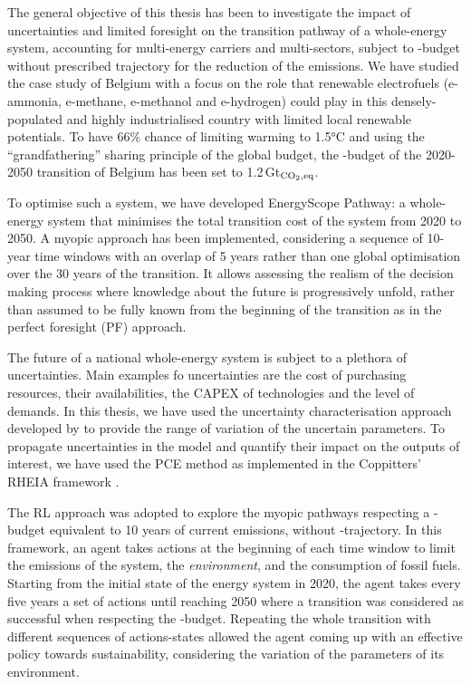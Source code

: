 

The general objective of this thesis has been to investigate the impact of uncertainties and limited foresight on the transition pathway of a whole-energy system, accounting for multi-energy carriers and multi-sectors, subject to -budget without prescribed trajectory for the reduction of the emissions.  We have studied the case study of Belgium with a focus on the role that renewable electrofuels (e-ammonia, e-methane, e-methanol and e-hydrogen) could play in this densely-populated and highly industrialised country with limited local renewable potentials. To have 66\% chance of limiting warming to 1.5°C and using the ``grandfathering'' sharing principle of the global budget, the -budget of the 2020-2050 transition of Belgium has been set to 1.2\,Gt$_{\ce{CO2},\text{eq}}$.

To optimise such a system, we have developed EnergyScope Pathway: a whole-energy system that minimises the total transition cost of the system from 2020 to 2050. A myopic approach has been implemented, considering a sequence of 10-year time windows with an overlap of 5 years rather than one global optimisation over the 30 years of the transition. It allows assessing the realism of the decision making process where knowledge about the future is progressively unfold, rather than assumed to be fully known from the beginning of the transition as in the perfect foresight (PF) approach. 

The future of a national whole-energy system is subject to a plethora of uncertainties. Main examples fo uncertainties are the cost of purchasing resources, their availabilities, the \acrfull{CAPEX} of technologies and the level of demands. In this thesis, we have used the uncertainty characterisation approach developed by \citet{moret2016strategic} to provide the range of variation of the uncertain parameters. To propagate uncertainties in the model and quantify their impact on the outputs of interest, we have used the \acrfull{PCE} method as implemented in the Coppitters' RHEIA framework \cite{coppittersthesis}.

The \acrfull{RL} approach was adopted to explore the myopic pathways respecting a -budget equivalent to 10 years of current emissions, without -trajectory. In this framework, an agent takes actions at the beginning of each time window to limit the emissions of the system, the \textit{environment}, and the consumption of fossil fuels. Starting from the initial state of the energy system in 2020, the agent takes every five years a set of actions until reaching 2050 where a transition was considered as successful when respecting the -budget. Repeating the whole transition with different sequences of actions-states allowed the agent coming up with an effective policy towards sustainability, considering the variation of the parameters of its environment.

